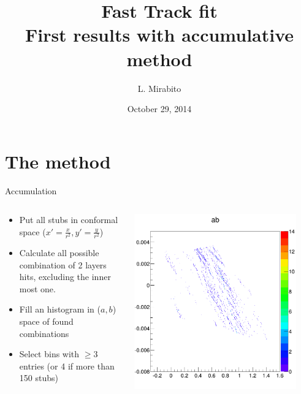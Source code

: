 \documentclass[10pt]{beamer}
\title[Fast Track fit]{Fast Track fit \\ First results with accumulative method}
\author{L. Mirabito}
\institute{IPN Lyon, UCB Lyon, IN2P3, CNRS}
\date{October 29, 2014}
\begin{document}


\begin{frame}
\titlepage
\end{frame}

\section{The method}

\begin{frame}{Accumulation}

\begin{columns}
   \begin{column}{0.5\textwidth}
    \begin{itemize}
    \item Put all stubs in conformal space ($x'=\frac{x}{r^2},y'=\frac{y}{r^2}$)
     \item Calculate all possible combination of 2 layers hits, excluding the inner most one.
     \item Fill an histogram in ($a,b$) space of found combinations
      \item Select bins with $ \ge 3 $ entries (or 4 if more than 150 stubs)
    \end{itemize}
  \end{column}

  \begin{column}{0.65\textwidth}
    \centerline{\includegraphics[width=0.9\textwidth]{acumul.png}}
  \end{column}
\end{columns}


\end{frame}
\end{document}
